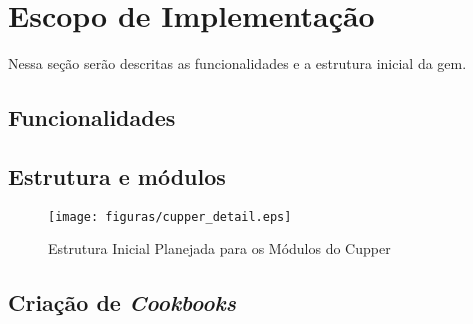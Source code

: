 \section{Escopo de Implementação}
\label{sec:escopo}
Nessa seção serão descritas as funcionalidades e a estrutura inicial da gem.

\subsection{Funcionalidades}

\subsection{Estrutura e módulos}

\begin{figure}[H]
  \centering
  \texttt{[image: figuras/cupper\_detail.eps]}
  \caption{Estrutura Inicial Planejada para os Módulos do Cupper}
  \label{fig:cupper-detail}
\end{figure}



\subsection{Criação de \textit{Cookbooks}}
